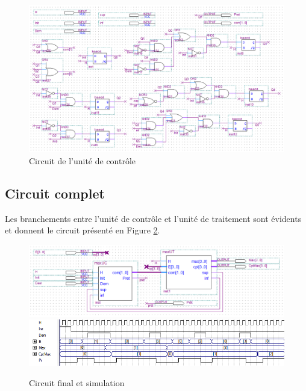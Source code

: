 \documentclass[a4paper,11pt]{article}
\begin{document}
\begin{figure}[h]
\center
\includegraphics[scale=0.5]{UC.png}
\caption{Circuit de l'unité de contrôle}
\label{UC}
\end{figure}

\subsection*{Circuit complet}

Les branchements entre l'unité de contrôle et l'unité de traitement sont évidents et donnent le circuit présenté en Figure \ref{max}.

\begin{figure}[h]
\center
\includegraphics[scale=0.55]{MaxSeq.png}\vspace*{1em}
\includegraphics[scale=0.6]{sim.png}
\caption{Circuit final et simulation}
\label{max}
\end{figure}
\end{document}
